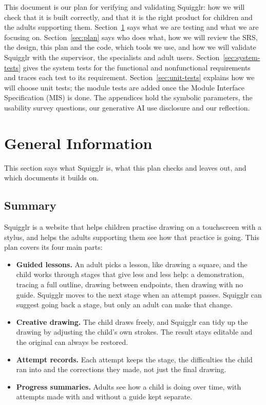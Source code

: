 \documentclass[12pt, titlepage]{article}
\begin{document}
\newpage


This document is our plan for verifying and validating Squigglr: how we will
check that it is built correctly, and that it is the right product for
children and the adults supporting them. Section~\ref{sec:general} says what
we are testing and what we are focusing on. Section~\ref{sec:plan} says who
does what, how we will review the SRS, the design, this plan and the code,
which tools we use, and how we will validate Squigglr with the supervisor,
the specialists and adult users. Section~\ref{sec:system-tests} gives the
system tests for the functional and nonfunctional requirements and traces
each test to its requirement. Section~\ref{sec:unit-tests} explains how we
will choose unit tests; the module tests are added once the Module Interface
Specification (MIS) is done. The
appendices hold the symbolic parameters, the usability survey questions, our
generative AI use disclosure and our reflection.

\section{General Information}
\label{sec:general}

This section says what Squigglr is, what this plan checks and leaves out, and
which documents it builds on.

\subsection{Summary}
\label{sec:summary}

Squigglr is a website that helps children practise drawing on a touchscreen
with a stylus, and helps the adults supporting them see how that practice is
going. This plan covers its four main parts:

\begin{itemize}
  \item \textbf{Guided lessons.} An adult picks a lesson, like drawing a
    square, and the child works through stages that give less and less help:
    a demonstration, tracing a full outline, drawing between endpoints, then
    drawing with no guide. Squigglr moves to the next stage when an attempt
    passes. Squigglr can suggest going back a stage, but only an adult can make
    that change.
  \item \textbf{Creative drawing.} The child draws freely, and Squigglr can
    tidy up the drawing by adjusting the child's own strokes. The result stays
    editable and the original can always be restored.
  \item \textbf{Attempt records.} Each attempt keeps the stage, the
    difficulties the child ran into and the corrections they made, not just
    the final drawing.
  \item \textbf{Progress summaries.} Adults see how a child is doing over time,
    with attempts made with and without a guide kept separate.
\end{itemize}
\end{document}
